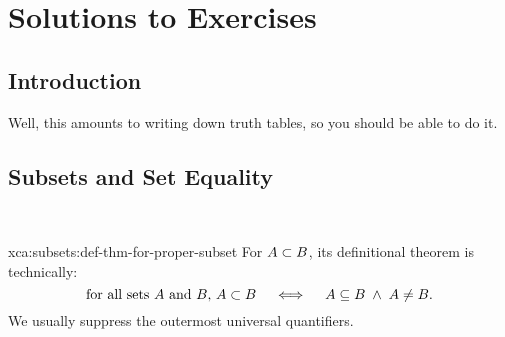 \section{Solutions to Exercises}

\subsection{Introduction} Well, this amounts to writing down truth
tables, so you should be able to do it.

\subsection{Subsets and Set Equality} \

\begin{solution}{xca:subsets:def-thm-for-proper-subset}
  For $A\propersubset B$, its definitional theorem is technically:
\begin{equation}
\mbox{for all sets $A$ and $B$, } A\propersubset B\quad\iff\quad A\subset B\;\land\; A\neq B.
\end{equation}
We usually suppress the outermost universal quantifiers.
\end{solution}


